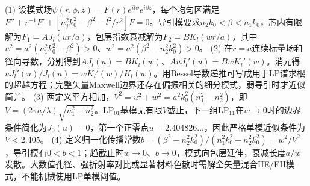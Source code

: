 (1) 设模式场\(\psi(r,\phi,z)=F(r)e^{il\phi}e^{i\beta z}\)，每个均匀区满足\(F''+r^{-1}F'+[n_j^2k_0^2-\beta^2-l^2/r^2]F=0\)。导引模要求\(n_2k_0<\beta<n_1k_0\)，芯内有限解为\(F_1=A J_l(ur/a)\)，包层指数衰减解为\(F_2=B K_l(wr/a)\)，其中\(u^2=a^2(n_1^2k_0^2-\beta^2)>0\)、\(w^2=a^2(\beta^2-n_2^2k_0^2)>0\)。
(2) 在\(r=a\)连续标量场和径向导数，分别得到\(AJ_l(u)=BK_l(w)\)、\(A uJ_l'(u)=B w K_l'(w)\)。消元得\(uJ_l'(u)/J_l(u)=wK_l'(w)/K_l(w)\)。用Bessel导数递推可写成用于LP谱求根的超越方程；完整矢量Maxwell边界还存在偏振相关的细分模式，弱导引时才近似简并。
(3) 两定义平方相加，\(V^2=u^2+w^2=a^2k_0^2(n_1^2-n_2^2)\)，即\(V=(2\pi a/\lambda)\sqrt{n_1^2-n_2^2}\)。LP\(_{01}\)基模无有限\(V\)截止，下一组LP\(_{11}\)在\(w\to0\)时的边界条件简化为\(J_0(u)=0\)，第一个正零点\(u=2.404826\ldots\)，因此严格单模近似条件为\(V<2.405\)。
(4) 定义归一化传播常数\(b=(\beta^2-n_2^2k_0^2)/(n_1^2k_0^2-n_2^2k_0^2)=w^2/V^2\)，导引模有\(0<b<1\)；趋截止时\(w\to0\)、\(b\to0\)，模式向包层延伸，衰减长度\(a/w\)发散。大数值孔径、强折射率对比或显著材料色散时需解全矢量混合HE/EH模式，不能机械使用LP单模阈值。

